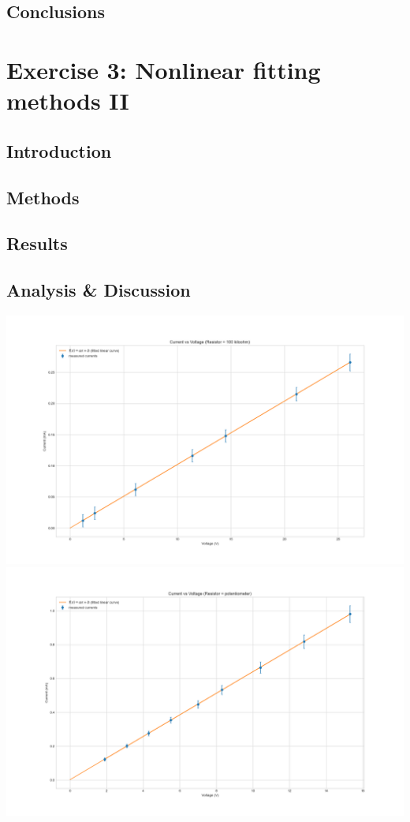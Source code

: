 \documentclass[letterpaper,12pt]{article}
\begin{document}
\subsection{Conclusions}

\pagebreak

\section{Exercise 3:  Nonlinear fitting methods II}

\subsection{Introduction}

\linebreak
{}
\subsection{Methods}
\subsection{Results}
\subsection{Analysis \& Discussion }

\begin{center}
    \includegraphics[width=1.0\linewidth]{../lab_1_ex_1_plot_100k.png}    
    \includegraphics[width=1.0\linewidth]{../lab_1_ex_1_plot_potentiometer.png}    
\end{center}
\end{document}
